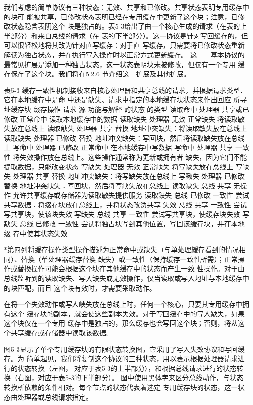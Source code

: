 我们考虑的简单协议有三种状态：无效、共享和已修改。共享状态表明专用缓存中的块可
能被共享，已修改状态表明已经在专用缓存中更新了这个块；注意，已修改状态隐含表阴这个
块是独占的。表5-3给出了由一个核心生成的请求（在表的上半部分）和来自总线的请求（在
表的下半部分）。这一协议是针对写回缓存的，但可以很轻松地将其改为针对直写缓存：对于直
写缓存，只需要将已修改状态重新解读为独占状态，并在执行写入操作时以正常方式更新缓存。
这一一基本协议的最常见扩展是添加一种独占状态，这一状态表明块未被修改，但仅有一个专用
缓存保存了这个块。我们将在5.2.6 节介绍这一扩展及其他扩展。

表5-3
缓存一致性机制接收来自核心处理器和共享总线的请求，并根据请求类型、它在本地缓存中是命
中还是缺失、请求中指定的本地缓存块状态来作出回应
所寻址缓存块
缀存操作
请求
源
功能与解释
的状态
的类型
读取命中
处理器
共享或已修改
正常命中
读取本地缓存中的数据
读取缺失
处理器
无效
正常缺失
将读取敏失放在总线上
读取觖失
处理器
共享
替换
地址冲突缺失：将读取敏失放在总线上
读取䱀失
处理器
已修改
替换
地址冲突缺失：写回块，然后将读取缺失放在总线上
写命中
处理器
已修改
正常命中
在本地缓存中写数据
写命中
处理器
共享
一致性
将失效操作放在总线上。这些操作通常称为更新或拥有者
缺失，因为它们不能提取数据，只能改变状态
写缺失
处理器
无效
正常缺失
将写缺失放在总线上
写缺失
处理器
共享
替换
地址冲突缺失：将写缺失放在总线上
写鳅失
处理器
已修改
替换
地址冲突缺失：写回块，然后将写缺失放在总线上
读取缺失
总线
共享
无操作
允许共享缓存或存储器为读取敏失提供服务
读取鉠失
总线
已修改
一致性
尝试共享数据：将缀存块放在总线上，并将状态改沩共享
失效
总线
共享
一致性
尝试写共享块，使该块失效
写缺失
总线
共享
一致性
尝试写共享块，使缓存块失效
写缺失
总线
已修改
一致性
尝试将独占块写到其他位置，写回该缓存块，并在本地缀
存中使其状态失效

*第四列将缓存操作类型操作描述为正常命中或缺失（与单处理緩存看到的情况相同）、替換（单处理器缓存替換
缺失）或一致性（保持缓存一致性所需）；正常操作或替換操作可能会根据这个块在其他缓存中的状态而产生一致
性操作。对于由总线监听到的读取缺失、写入缺失或无效操作，仅当读取或写入地址与本地缓存中的块匹配，而且
这个块有效时，才需要采取动作。

在将一个失效动作或写人峡失放在总线上时，任何一个核心，只要其专用缓存中拥有这个
缓存块的副本，就会使这些副本失效。对于写回缓存中的写人缺失，如果这个块仅在一个专用
缓存中是独占的，那么缓存也会写回这个块；否则，将从这个共享缓存或存储器中读取该数据。

图5-3显示了单个专用缓存块的有限状态转换图，它采用了写入失效协议和写回缓存。为
简单起见，我们将复制这个协议的三种状态，用以表示根据处理器请求进行的状态转换（左图，
对应于表5-3的上半部分），和根据总线请求进行的状态转换（右图，对应于表5-3的下半部分）。
图中使用黑体字来区分总线动作，与状态转换所依赖的条件相对。每个节点的状态代表着选定
专用缓存块的状态，这一状态由处理器或总线请求指定。

